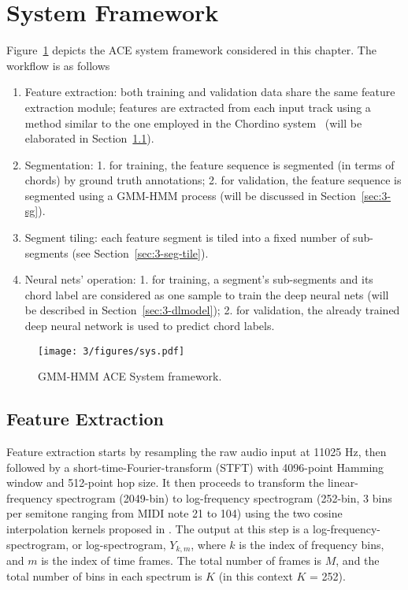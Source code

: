 
\section{System Framework} \label{sec:3-sysframe}

Figure~\ref{fig:3-sysover} depicts the ACE system framework considered in this chapter. The workflow is as follows%
\begin{enumerate}
	\item Feature extraction: both training and validation data share the same feature extraction module; features are extracted from each input track using a method similar to the one employed in the Chordino system~\cite{mauch2010automatic} (will be elaborated in Section~\ref{sec:3-fe}).
	\item Segmentation: 1. for training, the feature sequence is segmented (in terms of chords) by ground truth annotations; 2. for validation, the feature sequence is segmented using a GMM-HMM process (will be discussed in Section~\ref{sec:3-sg}).
	\item Segment tiling: each feature segment is tiled into a fixed number of sub-segments (see Section~\ref{sec:3-seg-tile}).
	\item Neural nets' operation: 1. for training, a segment's sub-segments and its chord label are considered as one sample to train the deep neural nets (will be described in Section~\ref{sec:3-dlmodel}); 2. for validation, the already trained deep neural network is used to predict chord labels.
\end{enumerate}

\begin{figure}
\centering
\texttt{[image: 3/figures/sys.pdf]}
\caption{GMM-HMM ACE System framework.}
\label{fig:3-sysover}
\end{figure}

\subsection{Feature Extraction} \label{sec:3-fe}
Feature extraction starts by resampling the raw audio input at 11025 Hz, then followed by a short-time-Fourier-transform (STFT) with 4096-point Hamming window and 512-point hop size. It then proceeds to transform the linear-frequency spectrogram (2049-bin) to log-frequency spectrogram (252-bin, 3 bins per semitone ranging from MIDI note 21 to 104) using the two cosine interpolation kernels proposed in \cite{mauch2010automatic}. The output at this step is a log-frequency-spectrogram, or log-spectrogram, $Y_{k,m}$, where $k$ is the index of frequency bins, and $m$ is the index of time frames. The total number of frames is $M$, and the total number of bins in each spectrum is $K$ (in this context $K$ = 252).

